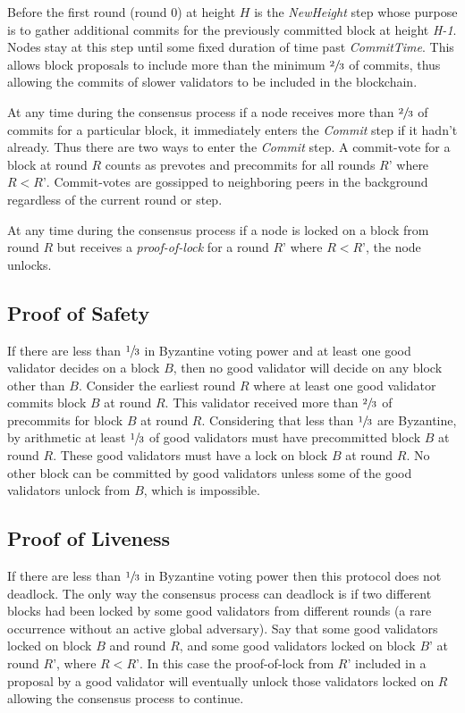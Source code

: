 \documentclass[letter,11pt]{article}
\begin{document}
Before the first round (round 0) at height $H$ is the \textit{NewHeight} step whose purpose is to gather additional commits for the previously committed block at height \textit{H-1}. Nodes stay at this step until some fixed duration of time past \textit{CommitTime}. This allows block proposals to include more than the minimum $\sfrac{2}{3}$ of commits, thus allowing the commits of slower validators to be included in the blockchain.

At any time during the consensus process if a node receives more than $\sfrac{2}{3}$ of commits for a particular block, it immediately enters the \textit{Commit} step if it hadn’t already. Thus there are two ways to enter the \textit{Commit} step. A commit-vote for a block at round $R$ counts as prevotes and precommits for all rounds $R’$ where $R < R’$. Commit-votes are gossipped to neighboring peers in the background regardless of the current round or step.

At any time during the consensus process if a node is locked on a block from round $R$ but receives a \textit{proof-of-lock} for a round $R’$ where $R < R’$, the node unlocks.


\subsection{Proof of Safety} %

If there are less than $\sfrac{1}{3}$ in Byzantine voting power and at least one good validator decides on a block $B$, then no good validator will decide on any block other than $B$. Consider the earliest round $R$ where at least one good validator commits block $B$ at round $R$. This validator received more than $\sfrac{2}{3}$ of precommits for block $B$ at round $R$. Considering that less than $\sfrac{1}{3}$ are Byzantine, by arithmetic at least $\sfrac{1}{3}$ of good validators must have precommitted block $B$ at round $R$. These good validators must have a lock on block $B$ at round $R$. No other block can be committed by good validators unless some of the good validators unlock from $B$, which is impossible.


\subsection{Proof of Liveness} %

If there are less than $\sfrac{1}{3}$ in Byzantine voting power then this protocol does not deadlock. The only way the consensus process can deadlock is if two different blocks had been locked by some good validators from different rounds (a rare occurrence without an active global adversary). Say that some good validators locked on block $B$ and round $R$, and some good validators locked on block $B’$ at round $R’$, where $R < R’$. In this case the proof-of-lock from $R’$ included in a proposal by a good validator will eventually unlock those validators locked on $R$ allowing the consensus process to continue.
\end{document}
